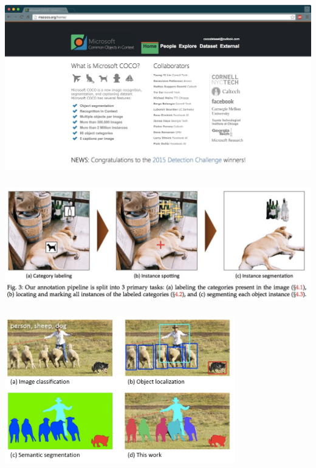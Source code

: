 \documentclass[xetex,mathserif,serif,aspectratio=169]{beamer}
\begin{document}
\begin{frame}[fragile] \frametitle{} \oldB \small

\textbf{}

\begin{center}
\includegraphics[width=\textwidth]{img/mscocoWeb.jpg}
\end{center}

\end{frame}

\begin{frame}[fragile] \frametitle{} \oldB \small

\begin{center}
\includegraphics[width=\textwidth]{img/segmentMSCOCO.jpg}
\end{center}

\end{frame}

\begin{frame}[fragile] \frametitle{} \oldB \small

\begin{center}
\includegraphics[width=0.75\textwidth]{img/segmentMSCOCO2.jpg}
\end{center}

\end{frame}
\end{document}
